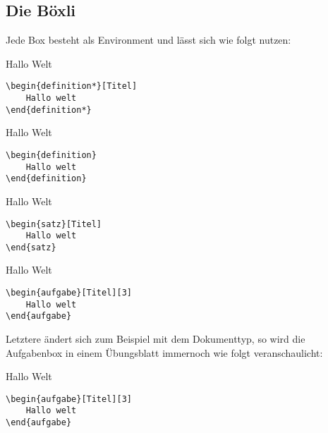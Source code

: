 \subsection[Wie funktionieren Boxen]{Die Böxli}
Jede Box besteht als Environment und lässt sich wie folgt nutzen:
\begin{multicols}{2}
\begin{definition*}[Titel]
    Hallo Welt
\begin{lstlisting}[language=lLatex]
\begin{definition*}[Titel]
    Hallo welt
\end{definition*}\end{lstlisting}
\end{definition*}

\begin{definition}
    Hallo Welt
\begin{lstlisting}[language=lLatex]
\begin{definition}
    Hallo welt
\end{definition}\end{lstlisting}
\end{definition}

\begin{satz}[Titel]
    Hallo Welt
\begin{lstlisting}[language=lLatex]
\begin{satz}[Titel]
    Hallo welt
\end{satz}\end{lstlisting}
\end{satz}

\begin{aufgabe}[Titel][3]
    Hallo Welt
\begin{lstlisting}[language=lLatex]
\begin{aufgabe}[Titel][3]
    Hallo welt
\end{aufgabe}\end{lstlisting}
\end{aufgabe}
\end{multicols}
Letztere ändert sich zum Beispiel mit dem Dokumenttyp, so wird die Aufgabenbox in einem Übungsblatt immernoch wie folgt veranschaulicht:
\begin{aufgabe}[Titel][3]
    Hallo Welt
\begin{lstlisting}[language=lLatex]
\begin{aufgabe}[Titel][3]
    Hallo welt
\end{aufgabe}\end{lstlisting}
\end{aufgabe}

